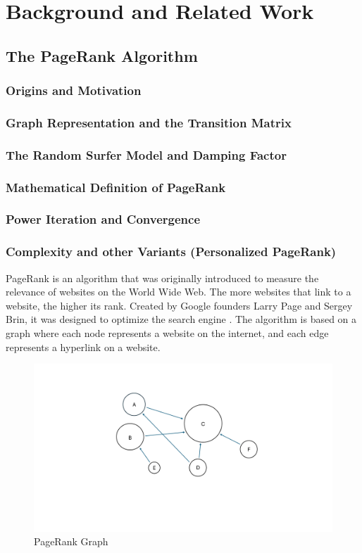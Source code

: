 
\section{Background and Related Work}
\subsection{The PageRank Algorithm}

\subsubsection{Origins and Motivation}
\subsubsection{Graph Representation and the Transition Matrix}
\subsubsection{The Random Surfer Model and Damping Factor}
\subsubsection{Mathematical Definition of PageRank}
\subsubsection{Power Iteration and Convergence}
\subsubsection{Complexity and other Variants (Personalized PageRank)}


PageRank is an algorithm that was originally introduced to measure the relevance of websites on the World Wide Web. The more websites that link to a website, the higher its rank. Created by Google founders Larry Page and Sergey Brin, it was designed to optimize the search engine \cite{page_pagerank_1999}.
The algorithm is based on a graph where each node represents a website on the internet, and each edge represents a hyperlink on a website.
\begin{figure}[ht]
    \centering
    \includegraphics[width=0.7\linewidth]{images/PageRank Graph.pdf}
    \caption{PageRank Graph}
    \label{fig:pagerank-toy}
\end{figure}


